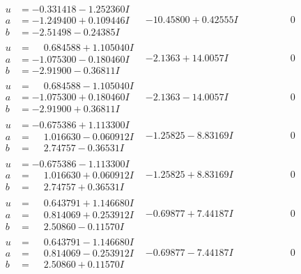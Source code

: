 \documentclass[1p]{elsarticle_modified}
\theoremstyle{definition}
\begin{document}
$$\begin{array}{c|c|c}
\begin{aligned}
u &= -0.331418 - 1.252360 I \\
a &= -1.249400 + 0.109446 I \\
b &= -2.51498 - 0.24385 I\end{aligned}
 & -10.45800 + 0.42555 I & \phantom{-0.000000 } 0 \\ \hline\begin{aligned}
u &= \phantom{-}0.684588 + 1.105040 I \\
a &= -1.075300 - 0.180460 I \\
b &= -2.91900 - 0.36811 I\end{aligned}
 & -2.1363 + 14.0057 I & \phantom{-0.000000 } 0 \\ \hline\begin{aligned}
u &= \phantom{-}0.684588 - 1.105040 I \\
a &= -1.075300 + 0.180460 I \\
b &= -2.91900 + 0.36811 I\end{aligned}
 & -2.1363 - 14.0057 I & \phantom{-0.000000 } 0 \\ \hline\begin{aligned}
u &= -0.675386 + 1.113300 I \\
a &= \phantom{-}1.016630 - 0.060912 I \\
b &= \phantom{-}2.74757 - 0.36531 I\end{aligned}
 & -1.25825 - 8.83169 I & \phantom{-0.000000 } 0 \\ \hline\begin{aligned}
u &= -0.675386 - 1.113300 I \\
a &= \phantom{-}1.016630 + 0.060912 I \\
b &= \phantom{-}2.74757 + 0.36531 I\end{aligned}
 & -1.25825 + 8.83169 I & \phantom{-0.000000 } 0 \\ \hline\begin{aligned}
u &= \phantom{-}0.643791 + 1.146680 I \\
a &= \phantom{-}0.814069 + 0.253912 I \\
b &= \phantom{-}2.50860 - 0.11570 I\end{aligned}
 & -0.69877 + 7.44187 I & \phantom{-0.000000 } 0 \\ \hline\begin{aligned}
u &= \phantom{-}0.643791 - 1.146680 I \\
a &= \phantom{-}0.814069 - 0.253912 I \\
b &= \phantom{-}2.50860 + 0.11570 I\end{aligned}
 & -0.69877 - 7.44187 I & \phantom{-0.000000 } 0\\

\end{array}$$
\end{document}
